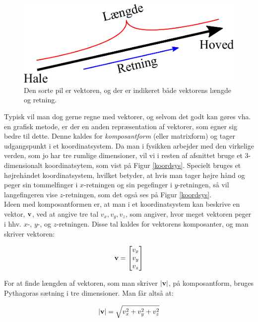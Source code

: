 \begin{figure}[h!]
	\centering
	\includegraphics[scale=0.6]{matematik/fig/vektor.pdf}
	\caption{Den sorte pil er vektoren, og der er indikeret både vektorens længde og retning. }
	\label{vektorfig}
\end{figure}

Typisk vil man dog gerne regne med vektorer, og selvom det godt kan gøres vha. en grafisk metode, er der en anden repræsentation af vektorer, som egner sig bedre til dette. Denne kaldes for \emph{komposantform} (eller matrixform)  og tager udgangspunkt i et koordinatsystem. Da man i fysikken arbejder med den virkelige verden, som jo har tre rumlige dimensioner, vil vi i resten af afsnittet bruge et 3-dimensionalt koordinatsytem, som vist på Figur \ref{koordsys}. Specielt bruges et højrehåndet koordinatsystem, hvilket betyder, at hvis man tager højre hånd og peger sin tommelfinger i $x$-retningen og sin pegefinger i $y$-retningen, så vil langefingeren vise $z$-retningen, som det også ses på Figur \ref{koordsys}.\\
Ideen med komposantformen er, at man i et koordinatsystem kan beskrive en vektor, $\mathbf{v}$, ved at angive tre tal $v_x,  v_y,  v_z$, som angiver, hvor meget vektoren peger i hhv. $x$-, $y$-, og $z$-retningen. Disse tal kaldes for vektorens komposanter, og man skriver vektoren:

\begin{equation}
\mathbf{v} = \begin{bmatrix} v_x \\ v_y \\ v_z \end{bmatrix}
\end{equation}

\vspace{2mm}

For at finde længden af vektoren, som man skriver $\left| \mathbf{v} \right|$, på komposantform, bruges Pythagoras sætning i tre dimensioner. Man får altså at:

\begin{equation}
\left| \mathbf{v} \right| = \sqrt{v_x^2 + v_y^2 + v_z^2}
\label{length}
\end{equation} 

\vspace{2mm}

